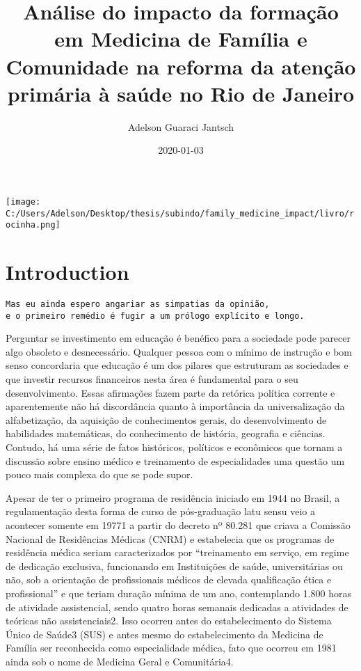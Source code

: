 \documentclass[]{book}
\title{Análise do impacto da formação em Medicina de Família e Comunidade na reforma da atenção primária à saúde no Rio de Janeiro}
\author{Adelson Guaraci Jantsch}
\date{2020-01-03}
\begin{document}
\maketitle

{
\setcounter{tocdepth}{1}
\tableofcontents
}
\hypertarget{section}{%
\chapter*{}\label{section}}

\texttt{[image: C:/Users/Adelson/Desktop/thesis/subindo/family\_medicine\_impact/livro/rocinha.png]}

\hypertarget{introduction}{%
\chapter*{Introduction}\label{introduction}}

\begin{verbatim}
Mas eu ainda espero angariar as simpatias da opinião, 
e o primeiro remédio é fugir a um prólogo explícito e longo.
\end{verbatim}

Perguntar se investimento em educação é benéfico para a sociedade pode parecer algo obsoleto e desnecessário. Qualquer pessoa com o mínimo de instrução e bom senso concordaria que educação é um dos pilares que estruturam as sociedades e que investir recursos financeiros nesta área é fundamental para o seu desenvolvimento. Essas afirmações fazem parte da retórica política corrente e aparentemente não há discordância quanto à importância da universalização da alfabetização, da aquisição de conhecimentos gerais, do desenvolvimento de habilidades matemáticas, do conhecimento de história, geografia e ciências. Contudo, há uma série de fatos históricos, políticos e econômicos que tornam a discussão sobre ensino médico e treinamento de especialidades uma questão um pouco mais complexa do que se pode supor.

Apesar de ter o primeiro programa de residência iniciado em 1944 no Brasil, a regulamentação desta forma de curso de pós-graduação latu sensu veio a acontecer somente em 19771 a partir do decreto nº 80.281 que criava a Comissão Nacional de Residências Médicas (CNRM) e estabelecia que os programas de residência médica seriam caracterizados por ``treinamento em serviço, em regime de dedicação exclusiva, funcionando em Instituições de saúde, universitárias ou não, sob a orientação de profissionais médicos de elevada qualificação ética e profissional'' e que teriam duração mínima de um ano, contemplando 1.800 horas de atividade assistencial, sendo quatro horas semanais dedicadas a atividades de teóricas não assistenciais2. Isso ocorreu antes do estabelecimento do Sistema Único de Saúde3 (SUS) e antes mesmo do estabelecimento da Medicina de Família ser reconhecida como especialidade médica, fato que ocorreu em 1981 ainda sob o nome de Medicina Geral e Comunitária4.
\end{document}
